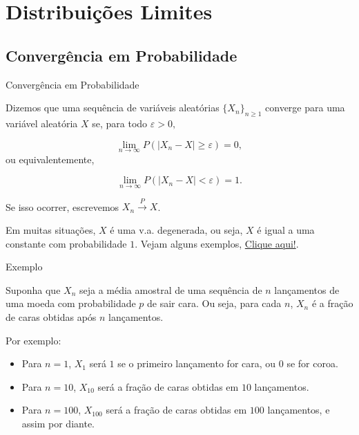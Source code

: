 \documentclass[12pt]{beamer}
\begin{document}
\section{Distribuições Limites}
\subsection{Convergência em Probabilidade}
\begin{frame}{Convergência em Probabilidade}
\begin{definicao}
\justifying
Dizemos que uma sequência de variáveis aleatórias $\{X_{n}\}_{n\geq 1}$  converge para uma variável aleatória $X$ se, para todo $\varepsilon > 0,$

\begin{equation}
\lim_{n\to\infty}P(|X_{n} - X| \geq \varepsilon) = 0,
\end{equation}
\pause
ou equivalentemente,

\begin{equation}
\lim_{n\to\infty}P(|X_{n} - X| < \varepsilon) = 1.
\end{equation}

Se isso ocorrer, escrevemos $X_{n} \xrightarrow{P} X$.    
\end{definicao}\pause
\begin{block}{}
    Em muitas situações, $X$ é uma v.a. degenerada, ou seja, $X$ é igual a uma constante com probabilidade $1.$ Vejam alguns exemplos, \href{https://est711.shinyapps.io/ConvergenciaProbabilidade/}{Clique aqui!}.
\end{block}
\end{frame}

\begin{frame}{Exemplo}
	\begin{block}{}
Suponha que \( X_n \) seja a média amostral de uma sequência de \( n \) lançamentos de uma moeda com probabilidade \( p \) de sair cara. Ou seja, para cada \( n \), \( X_n \) é a fração de caras obtidas após \( n \) lançamentos.

Por exemplo:
\begin{itemize}
	\item Para \( n = 1 \), \( X_1 \) será \( 1 \) se o primeiro lançamento for cara, ou \( 0 \) se for coroa.
	\item Para \( n = 10 \), \( X_{10} \) será a fração de caras obtidas em \( 10 \) lançamentos.
	\item Para \( n = 100 \), \( X_{100} \) será a fração de caras obtidas em \( 100 \) lançamentos, e assim por diante.
\end{itemize}
	\end{block}
\end{frame}
\end{document}
